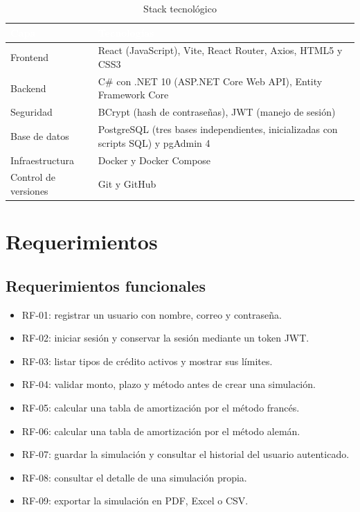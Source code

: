 \documentclass[12pt,a4paper]{article}
\begin{document}
\begin{table}[H]
\centering
\caption{Stack tecnológico}
\begin{tabularx}{\textwidth}{>{\raggedright\arraybackslash}p{3.5cm} X}
\toprule
\rowcolor{azulUTA}
\textcolor{white}{\textbf{Capa}} & \textcolor{white}{\textbf{Tecnologías}} \\
\midrule
Frontend & React (JavaScript), Vite, React Router, Axios, HTML5 y CSS3 \\
Backend & C\# con .NET 10 (ASP.NET Core Web API), Entity Framework Core \\
Seguridad & BCrypt (hash de contraseñas), JWT (manejo de sesión) \\
Base de datos & PostgreSQL (tres bases independientes, inicializadas con scripts SQL) y pgAdmin 4 \\
Infraestructura & Docker y Docker Compose \\
Control de versiones & Git y GitHub \\
\bottomrule
\end{tabularx}
\end{table}

\section{Requerimientos}

\subsection{Requerimientos funcionales}

\begin{itemize}[leftmargin=*]
    \item RF-01: registrar un usuario con nombre, correo y contraseña.
    \item RF-02: iniciar sesión y conservar la sesión mediante un token JWT.
    \item RF-03: listar tipos de crédito activos y mostrar sus límites.
    \item RF-04: validar monto, plazo y método antes de crear una simulación.
    \item RF-05: calcular una tabla de amortización por el método francés.
    \item RF-06: calcular una tabla de amortización por el método alemán.
    \item RF-07: guardar la simulación y consultar el historial del usuario autenticado.
    \item RF-08: consultar el detalle de una simulación propia.
    \item RF-09: exportar la simulación en PDF, Excel o CSV.
\end{itemize}
\end{document}
